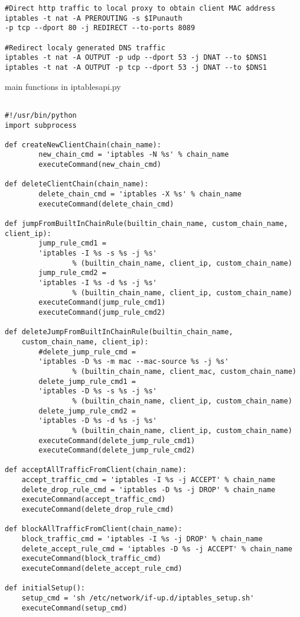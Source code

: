 \begin{appendices}
\begin{algorithm}[h]
\begin{verbatim}
#Direct http traffic to local proxy to obtain client MAC address
iptables -t nat -A PREROUTING -s $IPunauth 
-p tcp --dport 80 -j REDIRECT --to-ports 8089

#Redirect localy generated DNS traffic
iptables -t nat -A OUTPUT -p udp --dport 53 -j DNAT --to $DNS1
iptables -t nat -A OUTPUT -p tcp --dport 53 -j DNAT --to $DNS1
 \end{verbatim}
\end{algorithm}

\begin{algorithm}[h]
  \caption{main functions in iptablesapi.py}
  \label{code:iptablesapi}
  \begin{verbatim}
  
#!/usr/bin/python
import subprocess

def createNewClientChain(chain_name):
        new_chain_cmd = 'iptables -N %s' % chain_name
        executeCommand(new_chain_cmd)
        
def deleteClientChain(chain_name):
        delete_chain_cmd = 'iptables -X %s' % chain_name
        executeCommand(delete_chain_cmd)
        
def jumpFromBuiltInChainRule(builtin_chain_name, custom_chain_name, client_ip):
        jump_rule_cmd1 = 
        'iptables -I %s -s %s -j %s'  
        		% (builtin_chain_name, client_ip, custom_chain_name)
        jump_rule_cmd2 = 
        'iptables -I %s -d %s -j %s'  
        		% (builtin_chain_name, client_ip, custom_chain_name)
        executeCommand(jump_rule_cmd1)
        executeCommand(jump_rule_cmd2)

def deleteJumpFromBuiltInChainRule(builtin_chain_name, 
	custom_chain_name, client_ip):
        #delete_jump_rule_cmd = 
        'iptables -D %s -m mac --mac-source %s -j %s'  
        		% (builtin_chain_name, client_mac, custom_chain_name)  
        delete_jump_rule_cmd1 = 
        'iptables -D %s -s %s -j %s'  
        		% (builtin_chain_name, client_ip, custom_chain_name)
        delete_jump_rule_cmd2 = 
        'iptables -D %s -d %s -j %s'  
        		% (builtin_chain_name, client_ip, custom_chain_name)
        executeCommand(delete_jump_rule_cmd1)
        executeCommand(delete_jump_rule_cmd2)

def acceptAllTrafficFromClient(chain_name):
    accept_traffic_cmd = 'iptables -I %s -j ACCEPT' % chain_name
    delete_drop_rule_cmd = 'iptables -D %s -j DROP' % chain_name
    executeCommand(accept_traffic_cmd)
    executeCommand(delete_drop_rule_cmd)

def blockAllTrafficFromClient(chain_name):
    block_traffic_cmd = 'iptables -I %s -j DROP' % chain_name
    delete_accept_rule_cmd = 'iptables -D %s -j ACCEPT' % chain_name
    executeCommand(block_traffic_cmd)
    executeCommand(delete_accept_rule_cmd)

def initialSetup():
    setup_cmd = 'sh /etc/network/if-up.d/iptables_setup.sh'
    executeCommand(setup_cmd)

 \end{verbatim}
\end{algorithm}

\end{appendices}